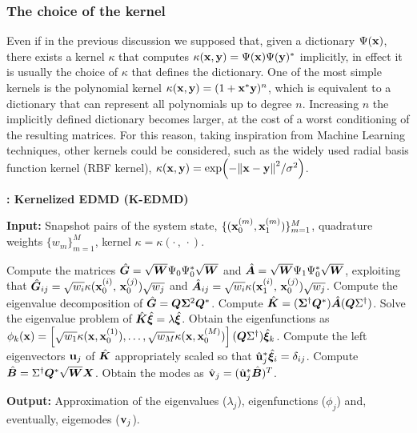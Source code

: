 \subsubsection{The choice of the kernel}
Even if in the previous discussion we supposed that, given a dictionary $\Psi(\vb{x})$, there exists a kernel $\kappa$ that computes $\kappa(\vb{x}, \vb{y}) = \Psi(\vb{x})\Psi(\vb{y})^*$ implicitly, in effect it is usually the choice of $\kappa$ that defines the dictionary. One of the most simple kernels is the polynomial kernel $\kappa(\vb{x}, \vb{y}) = (1 + \vb{x}^*\vb{y})^{n}$, which is equivalent to a dictionary that can represent all polynomials up to degree $n$. Increasing $n$ the implicitly defined dictionary becomes larger, at the cost of a worst conditioning of the resulting matrices. For this reason, taking inspiration from Machine Learning techniques, other kernels could be considered, such as the widely used radial basis function kernel (RBF kernel), $\kappa(\vb{x}, \vb{y}) = \exp(-\norm{\vb{x}-\vb{y}}^2 / \sigma^2)$.

\begin{algorithm}[h]
\caption{\textbf{: Kernelized EDMD (K-EDMD)}}
\label{alg_kedmd}
\textbf{Input:} Snapshot pairs of the system state, $\{(\vb{x}_0^{(m)}, \vb{x}_1^{(m)})\}_{m = 1}^M$, quadrature weights $\{w_m\}_{m = 1}^M$, kernel $\kappa = \kappa(\cdot\,,\,\cdot)$.
\begin{algorithmic}[1]
\State  Compute the matrices $\hat{\vb*{G}} = \sqrt{\vb*{W}}\Psi_0\Psi_0^*\sqrt{\vb*{W}}$ and  $\hat{\vb*{A}} = \sqrt{\vb*{W}}\Psi_1\Psi_0^*\sqrt{\vb*{W}}$, exploiting that $\hat{\vb*{G}}_{ij} = \sqrt{w_i} \kappa(\vb{x}_0^{(i)},\, \vb{x}_0^{(j)}) \sqrt{w_j}$ and
$\hat{\vb*{A}}_{ij} = \sqrt{w_i} \kappa(\vb{x}_1^{(i)},\, \vb{x}_0^{(j)}) \sqrt{w_j}$.
\State Compute the eigenvalue decomposition of $\hat{\vb*{G}} = \vb*{Q}\vb*{\Sigma}^2\vb*{Q}^*$.
\State Compute $\hat{\vb*{K}} = (\vb*{\Sigma}^{\dagger}\vb*{Q}^*)\hat{\vb*{A}} (\vb*{Q}\Sigma^{\dagger})$.
\State Solve the eigenvalue problem of $\hat{\vb*{K}}\hat{\bm{\xi}} = \lambda \hat{\bm{\xi}}$.
\State Obtain the eigenfunctions as $\phi_k(\vb{x}) = \left[\sqrt{w_1} \kappa(\vb{x}, \vb{x}_0^{(1)}), \dots, \sqrt{w_M} \kappa(\vb{x}, \vb{x}_0^{(M)})\right](\vb*{Q}\Sigma^{\dagger}) \hat{\bm{\xi}}_k$.
    \State Compute the left eigenvectors $\vb{u}_j$ of $\hat{\vb*{K}}$ appropriately scaled so that $\hat{\vb{u}}_j^*\hat{\bm{\xi}}_i = \delta_{ij}$.
    \State Compute $\hat{\vb*{B}} = \Sigma^{\dagger} \vb*{Q}^* \sqrt{\vb*{W}} \vb*{X}$.
    \State Obtain the modes as $\hat{\vb{v}}_j = (\hat{\vb{u}}_j^* \hat{\vb*{B}})^T$.
\EndIf
\end{algorithmic}
\textbf{Output:} Approximation of the eigenvalues ($\lambda_j$), eigenfunctions ($\phi_j$) and, eventually, eigemodes ($\vb{v}_j$).
\end{algorithm}

